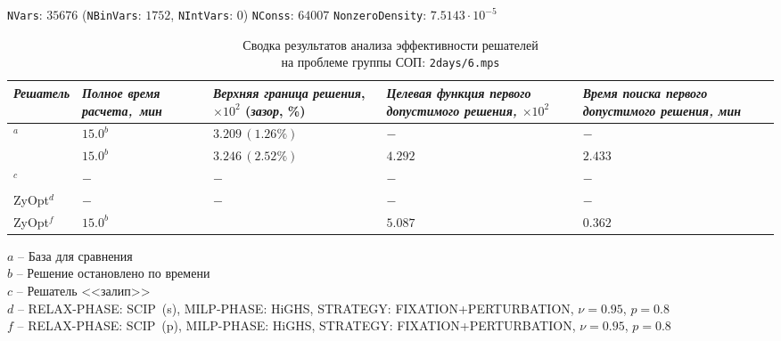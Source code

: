 \documentclass[%
	11pt,
	a4paper,
	utf8,
		]{article}
\begin{document}
\newpage
\vspace*{-8mm}
{
	\begin{table}[!h]
		\centering
		\caption{Сводка результатов анализа эффективности решателей\\ на проблеме группы СОП: \texttt{2days/6.mps}} 
		
		{\footnotesize \texttt{NVars}: $ 35676 $ (\texttt{NBinVars}: $ 1752 $,  \texttt{NIntVars}: $ 0 $) \texttt{NConss}: $ 64007 $ \texttt{NonzeroDensity}: $ 7.5143 \cdot 10^{-5} $}\\[2mm]
		
		\begin{tabular}{ p{2.9cm} | p{2.5cm} p{3.4cm} p{3.75cm} p{3.6cm} p{3.2cm} }
			\rowcolor{black!5}\emph{Решатель} & \emph{Полное время \mbox{расчета, мин}} & \emph{Верхняя граница} \mbox{\itshape решения}, $ \times 10^{2} $ (\emph{зазор}, \%) & \emph{Целевая функция первого допустимого решения, $ \times 10^2 $} & \emph{Время поиска первого допустимого решения, мин} \\
			\hline
			\rowcolor{blue!3}{CPLEX 12.8.0.0}$ ^a $ & $ 15.0^b $ & $ 3.209 \, (1.26\%) $ & $ - $ & $ - $ \\
			\rowcolor{black!5}{SCIP 8.0.3} & $ 15.0^b $ & $ 3.246 \, (2.52\%) $ & $ 4.292 $ & $ 2.433 $ \\
			\rowcolor{blue!3}{HiGHS 1.5.3}$ ^c $ & $ - $ & $ - $ & $ - $ & $ - $ \\
			\rowcolor{black!5}ZyOpt$^d $ & {$ -$}  & $ - $ & $ - $ & $ - $ \\
			\rowcolor{blue!3}ZyOpt$^f $ & {$ 15.0^b $}  & \ccb{$ 3.524 \, (5.05\%) (-9.8\%) $} & $ 5.087 $ & $ 0.362 $ 
		\end{tabular}
	\end{table}
	\vspace*{-3mm}
	\hspace*{3mm}$ a $ -- {\footnotesize База для сравнения}\\[-7mm]
	
	\hspace*{3mm}$ b $ -- {\footnotesize Решение остановлено по времени}\\[-7mm]
	
	\hspace*{3mm}$ c $ -- {\footnotesize Решатель <<залип>>}\\[-7mm]
	
	\hspace*{3mm}$ d $ -- {\footnotesize RELAX-PHASE: SCIP~(s), MILP-PHASE: HiGHS, STRATEGY: FIXATION+PERTURBATION, $ \nu = 0.95 $, $ p = 0.8 $}\\[-7mm]
	
	\hspace*{3mm}$ f $ -- {\footnotesize RELAX-PHASE: SCIP~(p), MILP-PHASE: HiGHS, STRATEGY: FIXATION+PERTURBATION, $ \nu = 0.95 $, $ p = 0.8 $}\\[-7mm]
}
\end{document}
